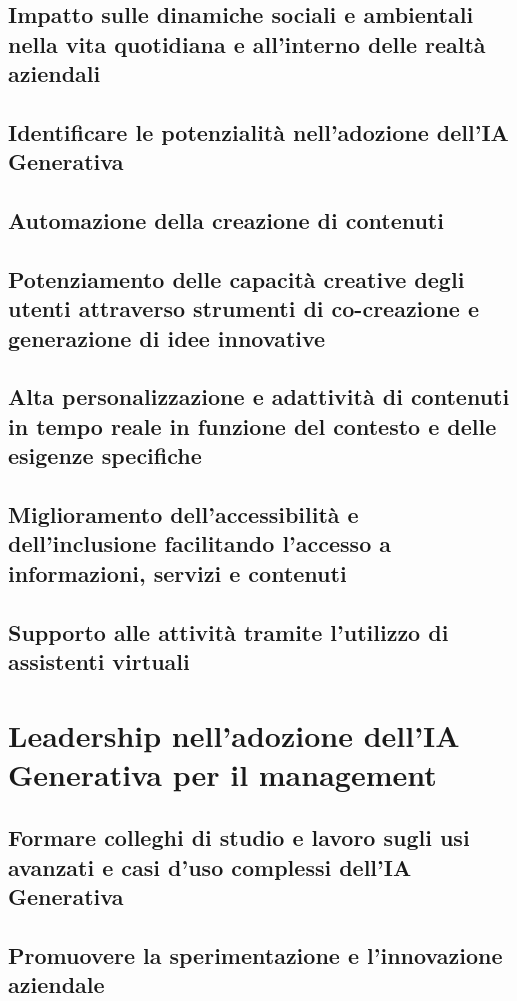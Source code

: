     \subsection{Impatto sulle dinamiche sociali e ambientali nella vita quotidiana e all'interno delle realtà aziendali}
    \subsection{Identificare le potenzialità nell'adozione dell'IA Generativa}
    \subsection{Automazione della creazione di contenuti}
    \subsection{Potenziamento delle capacità creative degli utenti attraverso strumenti di co-creazione e generazione di idee innovative}
    \subsection{Alta personalizzazione e adattività di contenuti in tempo reale in funzione del contesto e delle esigenze specifiche}
    \subsection{Miglioramento dell'accessibilità e dell'inclusione facilitando l'accesso a informazioni, servizi e contenuti}
    \subsection{Supporto alle attività tramite l’utilizzo di assistenti virtuali}

\section{Leadership nell'adozione dell'IA Generativa per il management}
    \subsection{Formare colleghi di studio e lavoro sugli usi avanzati e casi d'uso complessi dell'IA Generativa}
    \subsection{Promuovere la sperimentazione e l'innovazione aziendale}
